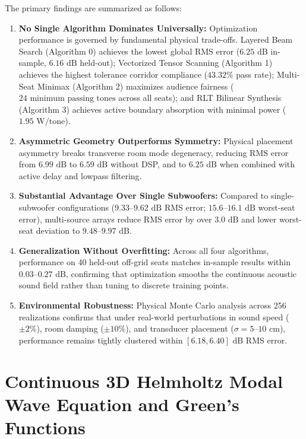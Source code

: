 \documentclass[11pt,a4paper,titlepage]{article}
\begin{document}
The primary findings are summarized as follows:
\begin{enumerate}
    \item \textbf{No Single Algorithm Dominates Universally:} Optimization performance is governed by fundamental physical trade-offs. Layered Beam Search (Algorithm 0) achieves the lowest global RMS error ($6.25\text{ dB}$ in-sample, $6.16\text{ dB}$ held-out); Vectorized Tensor Scanning (Algorithm 1) achieves the highest tolerance corridor compliance ($43.32\%$ pass rate); Multi-Seat Minimax (Algorithm 2) maximizes audience fairness ($24\text{ minimum passing tones}$ across all seats); and RLT Bilinear Synthesis (Algorithm 3) achieves active boundary absorption with minimal power ($1.95\text{ W/tone}$).
    \item \textbf{Asymmetric Geometry Outperforms Symmetry:} Physical placement asymmetry breaks transverse room mode degeneracy, reducing RMS error from $6.99\text{ dB}$ to $6.59\text{ dB}$ without DSP, and to $6.25\text{ dB}$ when combined with active delay and lowpass filtering.
    \item \textbf{Substantial Advantage Over Single Subwoofers:} Compared to single-subwoofer configurations ($9.33\text{--}9.62\text{ dB}$ RMS error; $15.6\text{--}16.1\text{ dB}$ worst-seat error), multi-source arrays reduce RMS error by over $3.0\text{ dB}$ and lower worst-seat deviation to $9.48\text{--}9.97\text{ dB}$.
    \item \textbf{Generalization Without Overfitting:} Across all four algorithms, performance on 40 held-out off-grid seats matches in-sample results within $0.03\text{--}0.27\text{ dB}$, confirming that optimization smooths the continuous acoustic sound field rather than tuning to discrete training points.
    \item \textbf{Environmental Robustness:} Physical Monte Carlo analysis across 256 realizations confirms that under real-world perturbations in sound speed ($\pm 2\%$), room damping ($\pm 10\%$), and transducer placement ($\sigma = 5\text{--}10\text{ cm}$), performance remains tightly clustered within $[6.18, 6.40]\text{ dB}$ RMS error.
\end{enumerate}

\newpage

\appendix

\section{Continuous 3D Helmholtz Modal Wave Equation and Green's Functions}
\label{app:helmholtz}
\end{document}
